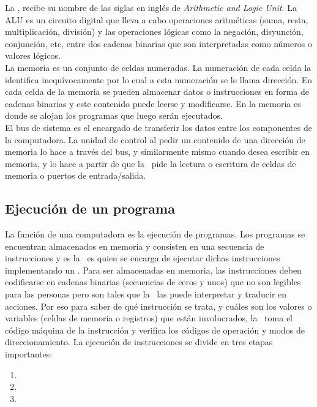 La \ALU, recibe su nombre de las siglas en inglés de \textit{Arithmetic and Logic Unit}. La ALU es un circuito digital que lleva a cabo operaciones aritméticas (suma, resta, multiplicación, división) y las operaciones lógicas como la negación, disyunción, conjunción, etc, entre dos cadenas binarias que son interpretadas como números o valores lógicos.\\

La memoria es un conjunto de celdas numeradas. La numeración de cada celda la identifica inequívocamente por lo cual a esta numeración se le llama dirección. En cada celda de la memoria se pueden almacenar datos o instrucciones en forma de cadenas binarias y este contenido puede leerse y modificarse. En la memoria es donde se alojan los programas que luego serán ejecutados.\\

El bus de sistema es el encargado de transferir los datos entre los componentes de la computadora..La unidad de control al pedir un contenido de una dirección de memoria lo hace a través del bus, y similarmente mismo cuando desea escribir en memoria, y lo hace a partir de que la \UC\ pide la lectura o escritura de celdas de memoria o puertos de entrada/salida.

\subsection{Ejecución de un programa}

La función de una computadora es la ejecución de programas. Los programas se encuentran almacenados en memoria y consisten en una secuencia de instrucciones y es la \UC\ es quien se encarga de ejecutar dichas instrucciones implementando un \textbf{\ciclo}. Para ser almacenadas en memoria, las instrucciones deben codificarse en cadenas binarias (secuencias de ceros y unos) que no son legibles para las personas pero son tales que la \UC\ las puede interpretar y traducir en acciones. Por eso para saber de qué instrucción se trata, y cuáles son los valores o variables (celdas de memoria o registros) que están involucrados, la \UC\ toma el código máquina de la instrucción y verifica los códigos de operación y modos de direccionamiento. La ejecución de instrucciones se divide en tres etapas importantes: 

\begin{enumerate}
\item \BI
\item \DI
\item \EI
\end{enumerate}


